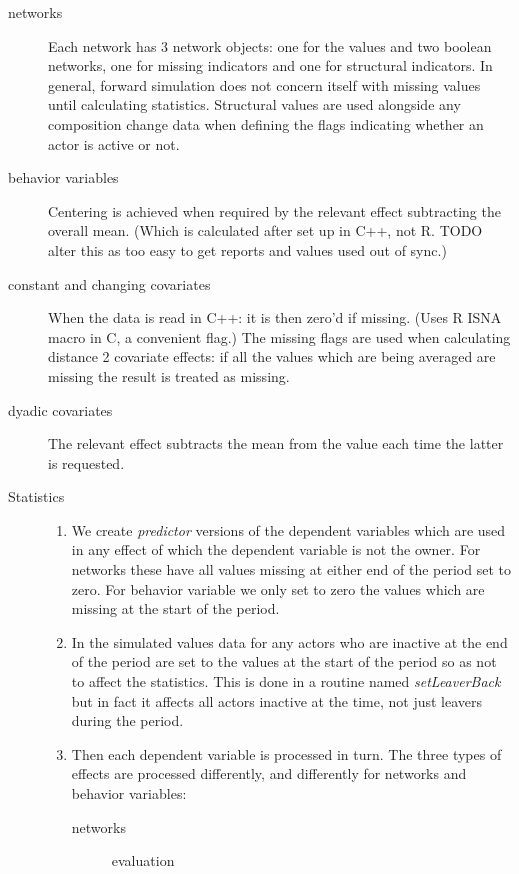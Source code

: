 \documentclass[12pt,a4paper]{article}
\renewcommand{\=}{\,=\,}
\newcommand{\+}{\,+\,}
\newcommand{\nnm}[1]{\textsf{\small\textit{#1}}}
\begin{document}
\begin{description}
\item[networks] Each network has 3 network objects: one for the values and two
  boolean networks, one for missing indicators and one for structural
  indicators. In general, forward simulation does not concern itself with
  missing values until calculating statistics. Structural values are used
  alongside any composition change data when defining the flags indicating
  whether an actor is active or not.
\item[behavior variables]
  Centering is achieved when required by the relevant effect subtracting the
  overall mean. (Which is calculated after set up in C++, not R. TODO alter this
  as too easy to get reports and values used out of sync.)
\item[constant and changing covariates] When the data is read in C++: it is then
  zero'd if missing. (Uses R ISNA macro in C, a convenient flag.) The missing
  flags are used when calculating distance 2 covariate effects: if all the
  values which are being averaged are missing the result is treated as missing.
\item[dyadic covariates] The relevant effect subtracts the mean from the value
  each time the latter is requested.
\item[Statistics]\hfill
\begin{enumerate}
\item We create \emph{predictor} versions of the dependent variables which are
  used in any effect of which the dependent variable is not the owner. For
  networks these have all values missing at either end of the period set to
  zero. For behavior variable we only set to zero the values which are missing
  at the start of the period.
\item In the simulated values data for any actors who are inactive at the end of
  the period are set to the values at the start of the period so as not to
  affect the statistics. This is done in a routine named \nnm{setLeaverBack} but
  in fact it affects all actors inactive at the time, not just leavers during
  the period.
\item Then each dependent variable is processed in turn. The three types of
  effects are processed differently, and differently for networks and behavior
  variables:
  \begin{description}
  \item[networks]\hfill
    \begin{description}
    \item[evaluation]\hfill

\end{description}
\end{description}
\end{enumerate}
\end{description}
\end{document}
